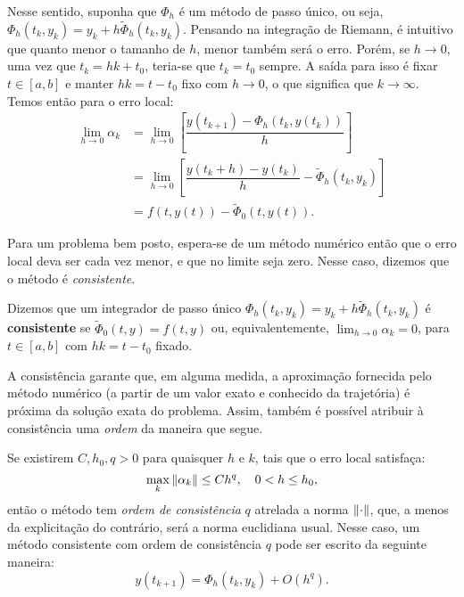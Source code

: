 Nesse sentido, suponha que $\Phi_h$ é um método de passo único, ou seja, $\Phi_h(t_k,y_k) = y_k + h \tilde{\Phi}_h(t_k,y_k)$. Pensando na integração de Riemann, é intuitivo que quanto menor o tamanho de $h$, menor também será o erro. Porém, se $h \to 0$, uma vez que $t_k = h k + t_0$, teria-se que $t_k = t_0$ sempre. A saída para isso é fixar $t \in [a,b]$ e manter $hk = t - t_0$ fixo com $h \to 0$, o que significa que $k \to \infty$. Temos então para o erro local:
\begin{align*}
    \lim_{h \to 0} \alpha_k
    &= \lim_{h \to 0} \left[ \dfrac{y(t_{k+1}) - \Phi_h(t_k, y(t_k))}{h} \right] \\
    &= \lim_{h \to 0} \left[ \dfrac{y(t_k + h) - y(t_k)}{h} - \tilde{\Phi}_h(t_k, y_k) \right] \\
    &= f(t,y(t)) - \tilde{\Phi}_0(t,y(t)).
\end{align*}

Para um problema bem posto, espera-se de um método numérico então que o erro local deva ser cada vez menor, e que no limite seja zero. Nesse caso, dizemos que o método é \textit{consistente}.

\begin{definition}
    Dizemos que um integrador de passo único $\Phi_h(t_k,y_k) = y_k + h \tilde{\Phi}_h(t_k,y_k)$ é \textbf{consistente} se $\tilde{\Phi}_0(t,y) = f(t,y)$ ou, equivalentemente, $\lim_{h \to 0} \alpha_k = 0$, para $t \in [a,b]$ com $hk = t - t_0$ fixado.
\end{definition}

A consistência garante que, em alguma medida, a aproximação fornecida pelo método numérico (a partir de um valor exato e conhecido da trajetória) é próxima da solução exata do problema. Assim, também é possível atribuir à consistência uma \textit{ordem} da maneira que segue.

\begin{definition}
    Se existirem $C, h_0, q >0$ para quaisquer $h$ e $k$, tais que o erro local satisfaça:
    \begin{equation*}
        \max_k \left\Vert \alpha_k \right\Vert \leq C h^q, \quad 0 < h \leq h_0,
    \end{equation*}
    então o método tem \textit{ordem de consistência} $q$ atrelada a norma $\left\Vert \cdot \right\Vert$, que, a menos da explicitação do contrário, será a norma euclidiana usual.
    Nesse caso, um método consistente com ordem de consistência $q$ pode ser escrito da seguinte maneira:
    \begin{equation*}
        y(t_{k+1}) = \Phi_h(t_k, y_k) + O(h^q).
    \end{equation*}
\end{definition}

